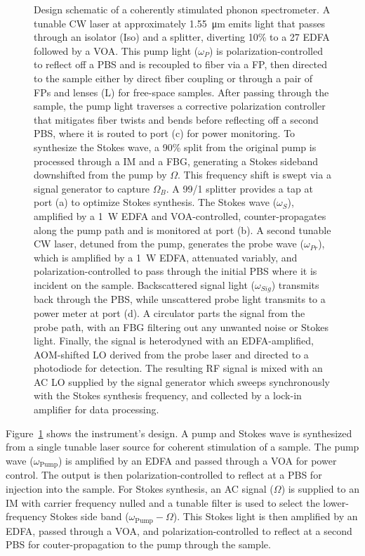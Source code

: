 \begin{figure}[htbp]
{Design schematic of a coherently stimulated phonon spectrometer. A tunable \ac{CW} laser at approximately \SI{1.55}{\micro\meter} emits light that passes through an isolator (Iso) and a splitter, diverting 10\% to a \SI{27}{\dBm} \ac{EDFA} followed by a \ac{VOA}. This pump light (\(\omega_P\)) is polarization-controlled to reflect off a \ac{PBS} and is recoupled to fiber via a \ac{FP}, then directed to the sample either by direct fiber coupling or through a pair of \ac{FP}s and lenses (L) for free-space samples. After passing through the sample, the pump light traverses a corrective polarization controller that mitigates fiber twists and bends before reflecting off a second \ac{PBS}, where it is routed to port (c) for power monitoring. To synthesize the Stokes wave, a 90\% split from the original pump is processed through a \ac{IM} and a \ac{FBG}, generating a Stokes sideband downshifted from the pump by \(\Omega\). This frequency shift is swept via a signal generator to capture \(\Omega_B\). A 99/1 splitter provides a tap at port (a) to optimize Stokes synthesis. The Stokes wave (\(\omega_S\)), amplified by a \SI{1}{\watt} \ac{EDFA} and \ac{VOA}-controlled, counter-propagates along the pump path and is monitored at port (b). A second tunable \ac{CW} laser, detuned from the pump, generates the probe wave (\(\omega_{Pr}\)), which is amplified by a \SI{1}{\watt} \ac{EDFA}, attenuated variably, and polarization-controlled to pass through the initial \ac{PBS} where it is incident on the sample. Backscattered signal light (\(\omega_{Sig}\)) transmits back through the \ac{PBS}, while unscattered probe light transmits to a power meter at port (d). A circulator parts the signal from the probe path, with an \ac{FBG} filtering out any unwanted noise or Stokes light. Finally, the signal is heterodyned with an \ac{EDFA}-amplified, \ac{AOM}-shifted \ac{LO} derived from the probe laser and directed to a photodiode for detection. The resulting \ac{RF} signal is mixed with an \ac{AC} \ac{LO} supplied by the signal generator which sweeps synchronously with the Stokes synthesis frequency, and collected by a lock-in amplifier for data processing.
}
\label{fig:Instrument Design}
\end{figure}

Figure~\ref{fig:Instrument Design} shows the instrument’s design. A pump and Stokes wave is synthesized from a single tunable laser source for coherent stimulation of a sample. The pump wave (\(\omega_{\mathrm{Pump}}\)) is amplified by an \acl{EDFA} and passed through a \acl{VOA} for power control. The output is then polarization-controlled to reflect at a \acl{PBS} for injection into the sample. For Stokes synthesis, an \acl{AC} signal (\(\Omega\)) is supplied to an \acl{IM} with carrier frequency nulled and a tunable filter is used to select the lower-frequency Stokes side band (\(\omega_{\mathrm{Pump}} - \Omega\)). This Stokes light is then amplified by an \ac{EDFA}, passed through a \ac{VOA}, and polarization-controlled to reflect at a second \ac{PBS} for couter-propagation to the pump through the sample.

